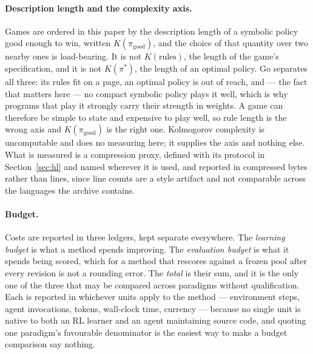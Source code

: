 \paragraph{Description length and the complexity axis.}
Games are ordered in this paper by the description length of a symbolic policy
good enough to win, written $K(\pi_{\text{good}})$, and the choice of that
quantity over two nearby ones is load-bearing. It is not $K(\text{rules})$, the
length of the game's specification, and it is not $K(\pi^{*})$, the length of an
optimal policy. Go separates all three: its rules fit on a page, an optimal
policy is out of reach, and --- the fact that matters here --- no compact symbolic
policy plays it well, which is why programs that play it strongly carry their
strength in weights. A game can therefore be simple to state and expensive to
play well, so rule length is the wrong axis and $K(\pi_{\text{good}})$ is the
right one. Kolmogorov complexity is uncomputable and does no measuring here; it
supplies the axis and nothing else. What is measured is a compression proxy,
defined with its protocol in Section~\ref{sec:hl} and named wherever it is used,
and reported in compressed bytes rather than lines, since line counts are a
style artifact and not comparable across the languages the archive contains.

\paragraph{Budget.}
Costs are reported in three ledgers, kept separate everywhere. The
\emph{learning budget} is what a method spends improving. The \emph{evaluation
budget} is what it spends being scored, which for a method that rescores against
a frozen pool after every revision is not a rounding error. The \emph{total} is
their sum, and it is the only one of the three that may be compared across
paradigms without qualification. Each is reported in whichever units apply to the
method --- environment steps, agent invocations, tokens, wall-clock time,
currency --- because no single unit is native to both an RL learner and an agent
maintaining source code, and quoting one paradigm's favourable denominator is the
easiest way to make a budget comparison say nothing.

